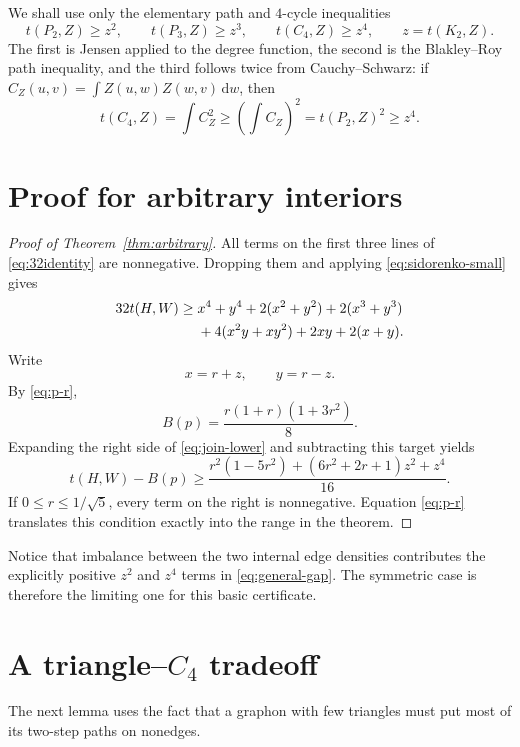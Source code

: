 \documentclass[11pt]{article}
\newcommand{\dd}{\,\mathrm d}
\begin{document}
We shall use only the elementary path and \(4\)-cycle inequalities
\begin{equation}\label{eq:sidorenko-small}
 t(P_2,Z)\geq z^2,\qquad
 t(P_3,Z)\geq z^3,\qquad
 t(C_4,Z)\geq z^4,
 \qquad z=t(K_2,Z).
\end{equation}
The first is Jensen applied to the degree function, the second is the
Blakley--Roy path inequality, and the third follows twice from
Cauchy--Schwarz: if \(C_Z(u,v)=\int Z(u,w)Z(w,v)\dd w\), then
\[
 t(C_4,Z)=\int C_Z^2
 \geq\left(\int C_Z\right)^2
 =t(P_2,Z)^2\geq z^4.
\]

\section{Proof for arbitrary interiors}

\begin{proof}[Proof of Theorem~\ref{thm:arbitrary}]
All terms on the first three lines of \eqref{eq:32identity} are
nonnegative.  Dropping them and applying \eqref{eq:sidorenko-small} gives
\begin{align}
32t(H,W)\geq{}&x^4+y^4+2(x^2+y^2)+2(x^3+y^3)\notag\\
&+4(x^2y+xy^2)+2xy+2(x+y).\label{eq:join-lower}
\end{align}
Write
\[
 x=r+z,\qquad y=r-z.
\]
By \eqref{eq:p-r},
\[
 B(p)=\frac{r(1+r)(1+3r^2)}8.
\]
Expanding the right side of \eqref{eq:join-lower} and subtracting this
target yields
\begin{equation}\label{eq:general-gap}
 t(H,W)-B(p)
 \geq
 \frac{
 r^2(1-5r^2)
 +(6r^2+2r+1)z^2+z^4
 }{16}.
\end{equation}
If \(0\leq r\leq1/\sqrt5\), every term on the right is nonnegative.
Equation \eqref{eq:p-r} translates this condition exactly into the range
in the theorem.
\end{proof}

Notice that imbalance between the two internal edge densities contributes
the explicitly positive \(z^2\) and \(z^4\) terms in
\eqref{eq:general-gap}.  The symmetric case is therefore the limiting one
for this basic certificate.

\section{A triangle--\(C_4\) tradeoff}

The next lemma uses the fact that a graphon with few triangles must put
most of its two-step paths on nonedges.
\end{document}
